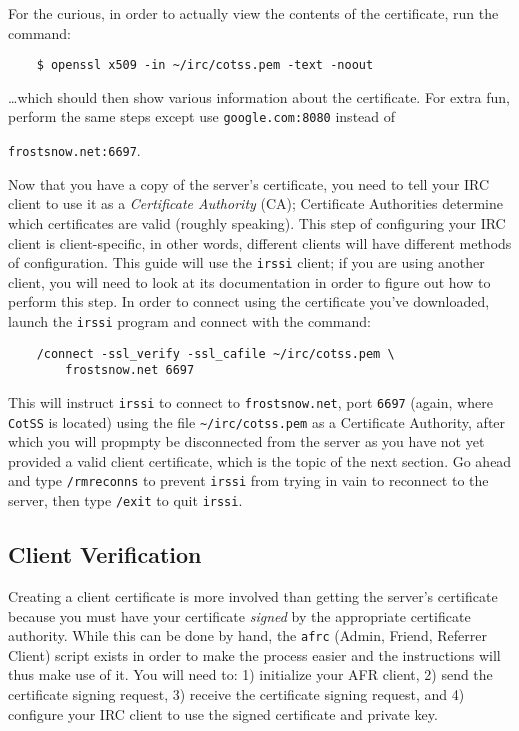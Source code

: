 \documentclass{article}
\begin{document}
For the curious, in order to actually view the contents of the certificate, run the command:
\begin{lstlisting}
	$ openssl x509 -in ~/irc/cotss.pem -text -noout
\end{lstlisting}
\ldots which should then show various information about the certificate.  For extra fun, perform the same steps except use \texttt{google.com:8080} instead of {\texttt{frostsnow.net:6697}.

Now that you have a copy of the server's certificate, you need to tell your IRC client to use it as a \textit{Certificate Authority} (CA); Certificate Authorities determine which certificates are valid (roughly speaking).  This step of configuring your IRC client is client-specific, in other words, different clients will have different methods of configuration.  This guide will use the \texttt{irssi} client; if you are using another client, you will need to look at its documentation in order to figure out how to perform this step.  In order to connect using the certificate you've downloaded, launch the \texttt{irssi} program and connect with the command:
\begin{lstlisting}
    /connect -ssl_verify -ssl_cafile ~/irc/cotss.pem \
        frostsnow.net 6697
\end{lstlisting}
This will instruct \texttt{irssi} to connect to \texttt{frostsnow.net}, port \texttt{6697} (again, where \texttt{CotSS} is located) using the file \texttt{\textasciitilde/irc/cotss.pem} as a Certificate Authority, after which you will propmpty be disconnected from the server as you have not yet provided a valid client certificate, which is the topic of the next section.  Go ahead and type \texttt{/rmreconns} to prevent \texttt{irssi} from trying in vain to reconnect to the server, then type \texttt{/exit} to quit \texttt{irssi}.

\subsection{Client Verification}
Creating a client certificate is more involved than getting the server's certificate because you must have your certificate \emph{signed} by the appropriate certificate authority.  While this can be done by hand, the \texttt{afrc} (Admin, Friend, Referrer Client) script exists in order to make the process easier and the instructions will thus make use of it.  You will need to: 1) initialize your AFR client, 2) send the certificate signing request, 3) receive the certificate signing request, and 4) configure your IRC client to use the signed certificate and private key.

}
\end{document}
